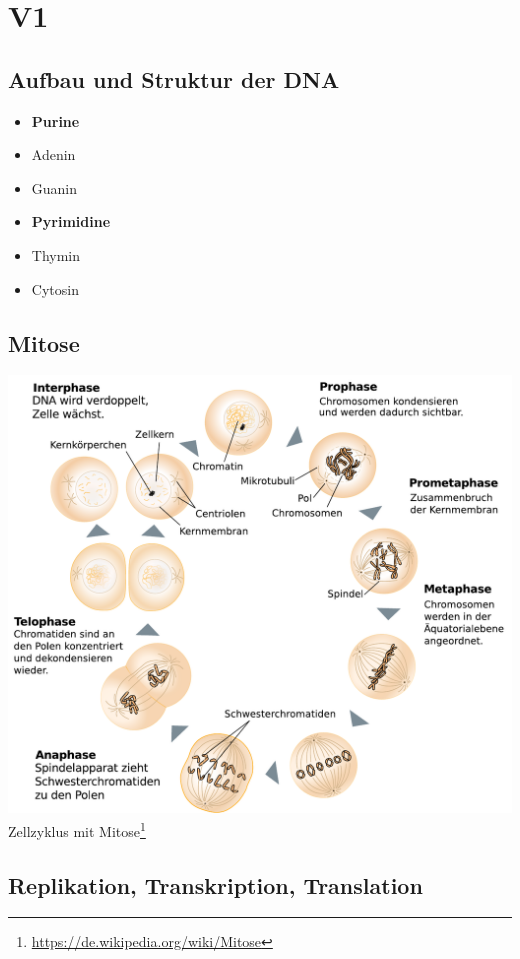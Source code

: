 \section{V1}
\subsection{Aufbau und Struktur der DNA}
\begin{itemize}
    \item[] \textbf{Purine}
    \item Adenin
    \item Guanin
\end{itemize}
\begin{itemize}
    \item[] \textbf{Pyrimidine}
    \item Thymin
    \item Cytosin
\end{itemize}

\subsection{Mitose}
\includegraphics[width=1\textwidth]{lectures/V1/pix/Schemazeichnung_Mitose.pdf}\\
Zellzyklus mit Mitose\footnote{\url{https://de.wikipedia.org/wiki/Mitose}}

\subsection{Replikation, Transkription, Translation}

